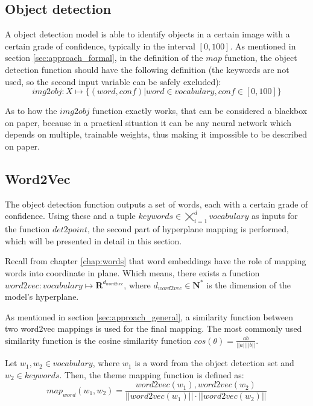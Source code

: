 \subsection{Object detection}
\label{subsec:approach_formal_obj}

A object detection model is able to identify objects in a certain image with a certain grade of confidence, typically in the interval $[0, 100]$. As mentioned in section \ref{sec:approach_formal}, in the definition of the $map$ function, the object detection function should have the following definition (the keywords are not used, so the second input variable can be safely excluded):
$$ img2obj : X \mapsto \{(word, conf) | word \in vocabulary, conf \in [0, 100]\} $$

As to how the $img2obj$ function exactly works, that can be considered a blackbox on paper, because in a practical situation it can be any neural network which depends on multiple, trainable weights, thus making it impossible to be described on paper.

\subsection{Word2Vec}
\label{subsec:approach_formal_word2vec}

The object detection function outputs a set of words, each with a certain grade of confidence. Using these and a tuple $keywords \in \bigtimes_{i=1}^{d}{vocabulary}$ as inputs for the function $det2point$, the second part of hyperplane mapping is performed, which will be presented in detail in this section.

Recall from chapter \ref{chap:words} that word embeddings have the role of mapping words into coordinate in plane. Which means, there exists a function $word2vec : vocabulary \mapsto \mathbf{R}^{d_{word2vec}} $, where $d_{word2vec} \in \mathbf{N^{*}}$ is the dimension of the model's hyperplane.

As mentioned in section \ref{sec:approach_general}, a similarity function between two word2vec mappings is used for the final mapping. The most commonly used similarity function is the cosine similarity function $cos(\theta) = \frac{a b}{|| a || || b ||} $. 

Let $w_1, w_2 \in vocabulary$, where $w_1$ is a word from the object detection set and $w_2 \in keywords$. Then, the theme mapping function is defined as:
$$ map_{word}(w_1, w_2) =  \frac{word2vec(w_1), word2vec(w_2)}{|| word2vec(w_1) || \cdot || word2vec(w_2) ||} $$

